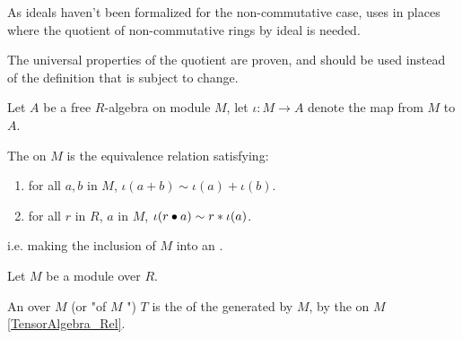 \begin{remark}
    \label{mk:RingQuot}

    As ideals haven't been formalized for the non-commutative case, \Mathlib uses  in places
    where the quotient of non-commutative rings by ideal is needed.

    The universal properties of the quotient are proven, and should be used instead of the definition that is subject to change.
    
\end{remark}

\begin{definition}
    \label{TensorAlgebra_Rel}
    \leanok

    Let $A$ be a free $R$-algebra on module $M$, let $\iota : M \to A$ denote the map from $M$ to $A$.

    The  on $M$ is the equivalence relation satisfying:

    \begin{enumerate}

    \item for all $a, b$ in $M$, $\iota(a + b) \sim \iota(a) + \iota(b)$.
    \item for all $r$ in $R$, $a$ in $M$, $\iota(r \bullet a) \sim r * \iota(a)$.
    
    \end{enumerate}

    i.e. making the inclusion of $M$ into an .

\end{definition}

\begin{definition}
    \label{TensorAlgebra}
    \leanok

    Let $M$ be a module over $R$.

    An  over $M$ (or "of $M$ ") $T$ is the  of the  generated by $M$, 
    by the  on $M$ \ref{TensorAlgebra_Rel}.

\end{definition}

